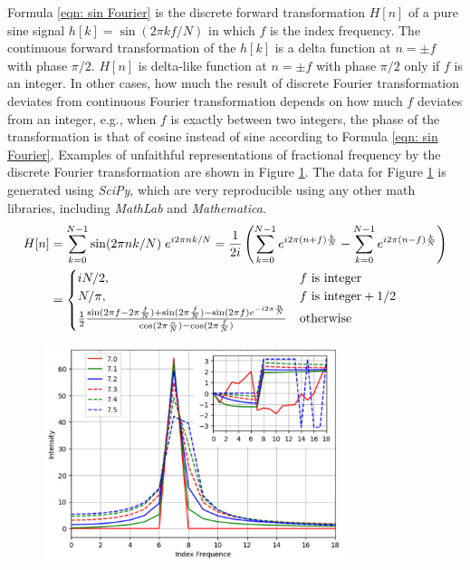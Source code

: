 \documentclass[twoside]{article}
\numberwithin{equation}{section}
\begin{document}
Formula \eqref{eqn: sin Fourier} is the discrete forward transformation $H[n]$ of a pure sine signal $h[k] = \sin(2\pi k f/N)$ in which $f$ is the index frequency.
The continuous forward transformation of the $h[k]$ is a delta function at $n = \pm f$ with phase $\pi/2$.
$H[n]$ is delta-like function at $n = \pm f$ with phase $\pi/2$ only if $f$ is an integer.
In other cases, how much the result of discrete Fourier transformation deviates from continuous Fourier transformation depends on how much $f$ deviates from an integer, e.g., when $f$ is exactly between two integers, the phase of the transformation is that of cosine instead of sine according to Formula \eqref{eqn: sin Fourier}.
Examples of unfaithful representations of fractional frequency by the discrete Fourier transformation are shown in Figure \ref{fig: FFT_Unfaithful}. 
The data for Figure \ref{fig: FFT_Unfaithful} is generated using \textit{SciPy}, which are very reproducible using any other math libraries, including \textit{MathLab} and \textit{Mathematica}.
\begin{align}
\centering
H[n] &=\sum_{k=0}^{N-1} \sin(2\pi n k/N) \; e^{i 2\pi n k/N} =
  \frac{1}{2 i} \left( \sum_{k=0}^{N-1} e^{i 2\pi (n+f)\frac{k}{N}}  - \sum_{k=0}^{N-1} e^{i 2\pi (n-f)\frac{k}{N}} \right) \nonumber \\
\label{eqn: sin Fourier}
&= \begin{cases}
  i N/2, & f \text{ is integer} \\
  N/\pi, & f \text{ is integer} + 1/2 \\
  \frac{1}{2} \frac{\sin(2\pi f - 2\pi \frac{f}{N}) + \sin(2\pi \frac{f}{N})-\sin(2\pi f) e^{-i 2\pi \frac{n}{N}}}{\cos(2\pi \frac{n}{N})-\cos(2\pi \frac{f}{N})} & \text{otherwise}
\end{cases}
\end{align}

\begin{figure}
\includegraphics[height=2.5in]{FFT_Unfaithful.pdf} 
\label{fig: FFT_Unfaithful}
\end{figure}
\end{document}
